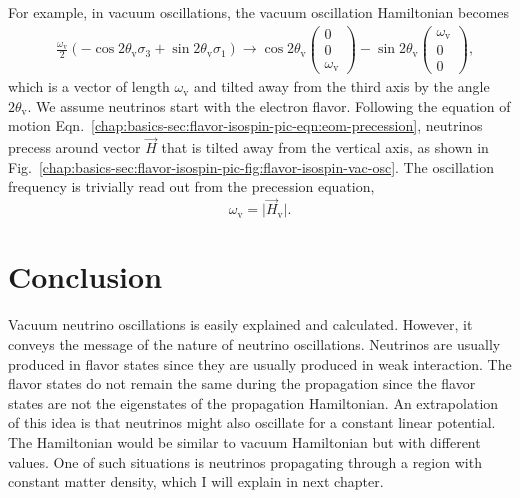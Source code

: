 For example, in vacuum oscillations, the vacuum oscillation Hamiltonian becomes
\begin{align*}
&\frac{\omega_{\mathrm v} }{2}\left( - \cos 2\theta_{\mathrm v } \sigma_3  + \sin 2\theta_{\mathrm{v}} \sigma_1 \right)
\to  \cos 2\theta_{\mathrm v}\begin{pmatrix}
0\\
0\\
\omega_{\mathrm v}
\end{pmatrix} -\sin 2\theta_{\mathrm v}\begin{pmatrix}
\omega_{\mathrm v}\\
0\\
0
\end{pmatrix},
\end{align*}
which is a vector of length $\omega_{\mathrm v}$ and tilted away from the third axis by the angle $2\theta_{\mathrm v}$. We assume neutrinos start with the electron flavor. Following the equation of motion Eqn.~\ref{chap:basics-sec:flavor-isospin-pic-eqn:eom-precession}, neutrinos precess around vector $\vec H$ that is tilted away from the vertical axis, as shown in Fig.~\ref{chap:basics-sec:flavor-isospin-pic-fig:flavor-isospin-vac-osc}. The oscillation frequency is trivially read out from the precession equation,
\begin{equation*}
    \omega_{\mathrm v} = \lvert \vec H_{\mathrm v} \rvert.
\end{equation*}





\section{Conclusion}

Vacuum neutrino oscillations is easily explained and calculated. However, it conveys the message of the nature of neutrino oscillations. Neutrinos are usually produced in flavor states since they are usually produced in weak interaction. The flavor states do not remain the same during the propagation since the flavor states are not the eigenstates of the propagation Hamiltonian. An extrapolation of this idea is that neutrinos might also oscillate for a constant linear potential. The Hamiltonian would be similar to vacuum Hamiltonian but with different values. One of such situations is neutrinos propagating through a region with constant matter density, which I will explain in next chapter.
